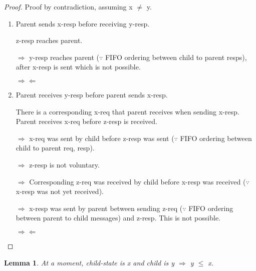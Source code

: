 \documentclass{article}
\newtheorem{lemma}{Lemma}
\begin{document}
\begin{proof}

Proof by contradiction, assuming x $\neq$ y.

\begin{enumerate}
\item Parent sends x-resp before receiving y-resp.

z-resp reaches parent.

\begin{figure}
\centering
\end{figure}

$\Rightarrow$ y-resp reaches parent ($\because$ FIFO ordering between child to parent resps), after x-resp is sent which is not possible.

$\Rightarrow \Leftarrow$

\item Parent receives y-resp before parent sends x-resp.

\begin{figure}
\centering
\end{figure}

There is a corresponding x-req that parent receives when sending x-resp. Parent receives x-req before z-resp is received.

$\Rightarrow$ x-req was sent by child before z-resp was sent ($\because$ FIFO ordering between child to parent req, resp).

$\Rightarrow$ z-resp is not voluntary.

$\Rightarrow$ Corresponding z-req was received by child before x-resp was received ($\because$ x-resp was not yet received).

$\Rightarrow$ x-resp was sent by parent between sending z-req ($\because$ FIFO ordering between parent to child messages) and z-resp. This is not possible.

$\Rightarrow \Leftarrow$

\end{enumerate}

\end{proof}

\begin{lemma}
At a moment, child-state is x and child is y $\Rightarrow$ y $\le$ x.
\label{<=}
\end{lemma}

%
%
%
\end{document}
